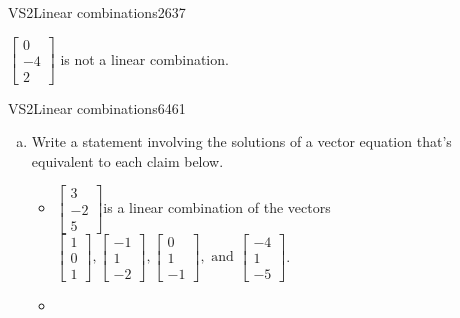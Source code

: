 \begin{exercise}{VS2}{Linear combinations}{2637}
\begin{exerciseAnswer}
\begin{itemize}
 

 \(\left[\begin{array}{c}
0 \\
-4 \\
2
\end{array}\right]\) is not a linear combination. 

 
\end{itemize}

     \end{exerciseAnswer}
 \end{exercise}


\begin{exercise}{VS2}{Linear combinations}{6461} 
\begin{exerciseStatement} 

\begin{enumerate}[(a)]
\item  

 Write a statement involving the solutions of a vector equation that's equivalent to each claim below. 

 

\begin{itemize}
\item  

 \(\left[\begin{array}{c}
3 \\
-2 \\
5
\end{array}\right]\)is a linear combination of the vectors \(\left[\begin{array}{c}
1 \\
0 \\
1
\end{array}\right] , \left[\begin{array}{c}
-1 \\
1 \\
-2
\end{array}\right] , \left[\begin{array}{c}
0 \\
1 \\
-1
\end{array}\right] , \text{ and } \left[\begin{array}{c}
-4 \\
1 \\
-5
\end{array}\right]\). 

 
\item  


\end{itemize}
\end{enumerate}
\end{exerciseStatement}
\end{exercise}
